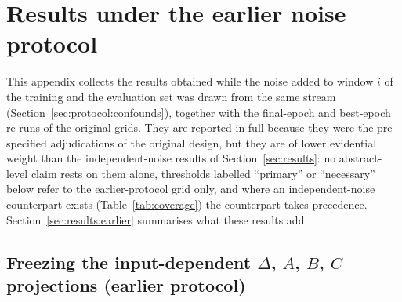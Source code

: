\section{Results under the earlier noise protocol}
\label{app:earlier}

This appendix collects the results obtained while the noise added to window $i$ of the training and the evaluation set was drawn from the same stream (Section~\ref{sec:protocol:confounds}), together with the final-epoch and best-epoch re-runs of the original grids. They are reported in full because they were the pre-specified adjudications of the original design, but they are of lower evidential weight than the independent-noise results of Section~\ref{sec:results}: no abstract-level claim rests on them alone, thresholds labelled ``primary'' or ``necessary'' below refer to the earlier-protocol grid only, and where an independent-noise counterpart exists (Table~\ref{tab:coverage}) the counterpart takes precedence. Section~\ref{sec:results:earlier} summarises what these results add.

\subsection{Freezing the input-dependent \texorpdfstring{$\Delta$, $A$, $B$, $C$}{Delta, A, B, C} projections (earlier protocol)}
\label{sec:results:falsify}

